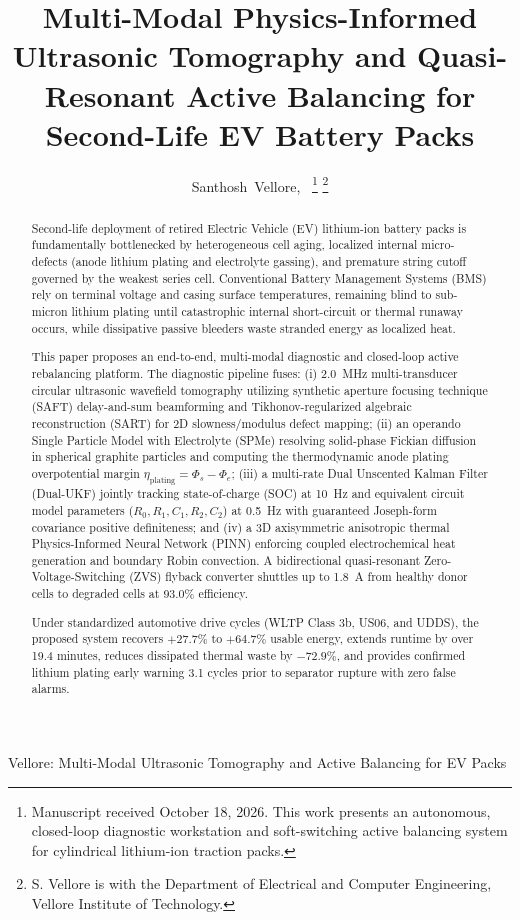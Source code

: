 \documentclass[journal]{IEEEtran}
\begin{document}
\title{Multi-Modal Physics-Informed Ultrasonic Tomography and Quasi-Resonant Active Balancing for Second-Life EV Battery Packs}

\author{Santhosh~Vellore,~
\thanks{Manuscript received October 18, 2026. This work presents an autonomous, closed-loop diagnostic workstation and soft-switching active balancing system for cylindrical lithium-ion traction packs.}
\thanks{S. Vellore is with the Department of Electrical and Computer Engineering, Vellore Institute of Technology.}
}

%
{Vellore: Multi-Modal Ultrasonic Tomography and Active Balancing for EV Packs}

\maketitle

\begin{abstract}
Second-life deployment of retired Electric Vehicle (EV) lithium-ion battery packs is fundamentally bottlenecked by heterogeneous cell aging, localized internal micro-defects (anode lithium plating and electrolyte gassing), and premature string cutoff governed by the weakest series cell. Conventional Battery Management Systems (BMS) rely on terminal voltage and casing surface temperatures, remaining blind to sub-micron lithium plating until catastrophic internal short-circuit or thermal runaway occurs, while dissipative passive bleeders waste stranded energy as localized heat. 

This paper proposes an end-to-end, multi-modal diagnostic and closed-loop active rebalancing platform. The diagnostic pipeline fuses: (i) 2.0~MHz multi-transducer circular ultrasonic wavefield tomography utilizing synthetic aperture focusing technique (SAFT) delay-and-sum beamforming and Tikhonov-regularized algebraic reconstruction (SART) for 2D slowness/modulus defect mapping; (ii) an operando Single Particle Model with Electrolyte (SPMe) resolving solid-phase Fickian diffusion in spherical graphite particles and computing the thermodynamic anode plating overpotential margin $\eta_{\text{plating}} = \Phi_s - \Phi_e$; (iii) a multi-rate Dual Unscented Kalman Filter (Dual-UKF) jointly tracking state-of-charge (SOC) at 10~Hz and equivalent circuit model parameters ($R_0, R_1, C_1, R_2, C_2$) at 0.5~Hz with guaranteed Joseph-form covariance positive definiteness; and (iv) a 3D axisymmetric anisotropic thermal Physics-Informed Neural Network (PINN) enforcing coupled electrochemical heat generation and boundary Robin convection. A bidirectional quasi-resonant Zero-Voltage-Switching (ZVS) flyback converter shuttles up to 1.8~A from healthy donor cells to degraded cells at 93.0\% efficiency. 

Under standardized automotive drive cycles (WLTP Class 3b, US06, and UDDS), the proposed system recovers $+27.7\%$ to $+64.7\%$ usable energy, extends runtime by over 19.4 minutes, reduces dissipated thermal waste by $-72.9\%$, and provides confirmed lithium plating early warning 3.1 cycles prior to separator rupture with zero false alarms.
\end{abstract}
\end{document}
